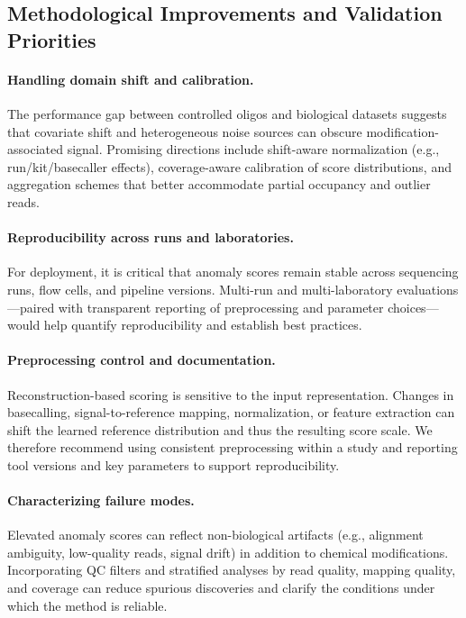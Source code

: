 \documentclass[journal,article,submit,pdftex,moreauthors]{Definitions/mdpi}
\begin{document}
\subsection{Methodological Improvements and Validation Priorities}
\paragraph{Handling domain shift and calibration.}
The performance gap between controlled oligos and biological datasets suggests that covariate shift and heterogeneous noise sources can obscure modification-associated signal. Promising directions include shift-aware normalization (e.g., run/kit/basecaller effects), coverage-aware calibration of score distributions, and aggregation schemes that better accommodate partial occupancy and outlier reads.

\paragraph{Reproducibility across runs and laboratories.}
For deployment, it is critical that anomaly scores remain stable across sequencing runs, flow cells, and pipeline versions. Multi-run and multi-laboratory evaluations—paired with transparent reporting of preprocessing and parameter choices—would help quantify reproducibility and establish best practices.

\paragraph{Preprocessing control and documentation.}
Reconstruction-based scoring is sensitive to the input representation. Changes in basecalling, signal-to-reference mapping, normalization, or feature extraction can shift the learned reference distribution and thus the resulting score scale. We therefore recommend using consistent preprocessing within a study and reporting tool versions and key parameters to support reproducibility.

\paragraph{Characterizing failure modes.}
Elevated anomaly scores can reflect non-biological artifacts (e.g., alignment ambiguity, low-quality reads, signal drift) in addition to chemical modifications. Incorporating QC filters and stratified analyses by read quality, mapping quality, and coverage can reduce spurious discoveries and clarify the conditions under which the method is reliable.
\end{document}
